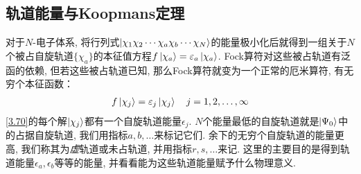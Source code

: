 \subsection{轨道能量与Koopmans定理}
对于$N$-电子体系, 
将行列式$\Ket{\chi_1\chi_2\cdots\chi_a\chi_b\cdots\chi_N}$的能量极小化后就得到一组关于$N$个被占自旋轨道$\{\chi_a\}$的本征值方程$f\Ket{\chi_a} = \varepsilon_a\Ket{\chi_a}$. 
Fock算符对这些被占轨道有泛函的依赖, 
但若这些被占轨道已知, 
那么Fock算符就变为一个正常的厄米算符, 
有无穷个本征函数：
\begin{align}
	\label{3.70}
	f\Ket{\chi_j} = \varepsilon_j\Ket{\chi_j}\quad j = 1,2,\ldots,\infty
\end{align}
\autoref{3.70}的每个解$\Ket{\chi_j}$都有一个自旋轨道能量$\epsilon_j$. $N$个能量最低的自旋轨道就是$\Ket{\Psi_0}$中的占据自旋轨道, 我们用指标$a,b,\ldots$来标记它们. 余下的无穷个自旋轨道的能量更高, 我们称其为\emph{虚}轨道或未占轨道, 并用指标$r,s,\ldots$来记. 这里的主要目的是得到轨道能量$\epsilon_a,\epsilon_b$等等的能量, 并看看能为这些轨道能量赋予什么物理意义.

